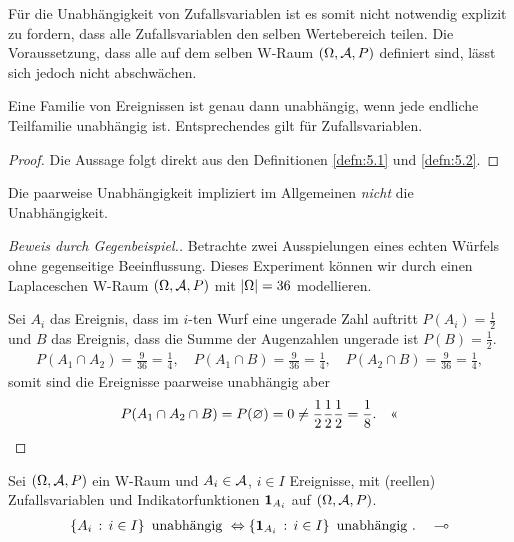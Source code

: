 Für die Unabhängigkeit von Zufallsvariablen ist es somit nicht notwendig
explizit zu fordern, dass alle Zufallsvariablen den selben Wertebereich
teilen. Die Voraussetzung, dass alle auf dem selben W-Raum
$(\Omega,\AA,P)$ definiert sind, lässt sich jedoch nicht abschwächen.

\begin{lem}
\label{lem:5.1}
Eine Familie von Ereignissen ist genau dann unabhängig,
wenn jede endliche Teilfamilie unabhängig ist. Entsprechendes gilt für
Zufallsvariablen.\fishhere
\end{lem}
\begin{proof}
Die Aussage folgt direkt aus den Definitionen \ref{defn:5.1} und
\ref{defn:5.2}.\qedhere
\end{proof}

\begin{bem}
\label{bem:5.1}
Die paarweise Unabhängigkeit impliziert im Allgemeinen
\textit{nicht} die Unabhängigkeit.\maphere
\end{bem}
\begin{proof}[Beweis durch Gegenbeispiel.]
Betrachte zwei Ausspielungen eines echten Würfels ohne gegenseitige
Beeinflussung. Dieses Experiment können wir durch einen Laplaceschen W-Raum
$(\Omega,\AA,P)$ mit $\abs{\Omega}=36$ modellieren.

Sei $A_i$ das Ereignis, dass im $i$-ten Wurf eine ungerade Zahl auftritt
$P(A_i)=\frac{1}{2}$ und $B$ das Ereignis, dass die Summe der Augenzahlen
ungerade ist $P(B)=\frac{1}{2}$.
\begin{align*}
P(A_1\cap A_2) = \frac{9}{36} = \frac{1}{4},\quad
P(A_1\cap B) = \frac{9}{36} = \frac{1}{4},\quad
P(A_2\cap B) = \frac{9}{36} = \frac{1}{4},
\end{align*}
somit sind die Ereignisse paarweise unabhängig aber
\begin{align*}
P(A_1\cap A_2 \cap B) = P(\varnothing) = 0 \neq
\frac{1}{2}\frac{1}{2}\frac{1}{2} = \frac{1}{8}.\qedhere
\end{align*}
\end{proof}

\begin{bem}
\label{bem:5.2}
Sei $(\Omega, \AA,P)$ ein W-Raum und  $A_{i}\in {\cal
A}$, $i\in I$ Ereignisse, mit (reellen) Zufallsvariablen und
Indikatorfunktionen $\Id_{A_{i}}$ auf $(\Omega, \AA, P)$.
\begin{align*}
\setdef{ A_{i} }{ i\in I } \mbox{ unabhängig } \Leftrightarrow \setdef{\Id
_{A_{i}}}{ i\in I } \mbox{ unabhängig }.\maphere
\end{align*}
\end{bem}

